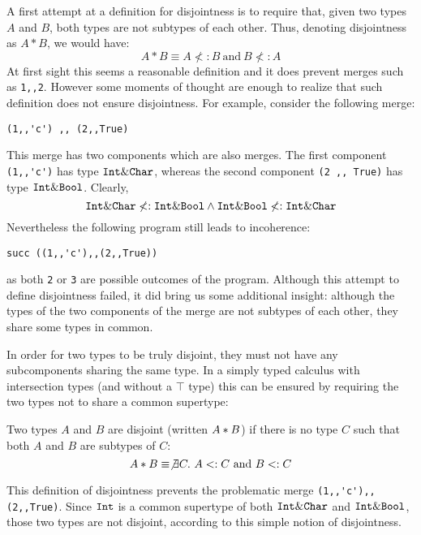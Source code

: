 A first attempt at a definition for disjointness is to require that,
given two types $A$ and $B$, both types are not subtypes of each
other. Thus, denoting disjointness as $A * B$, we would have:
\[A * B \equiv A \not<: B~\text{and}~B \not<: A\]
At first sight this seems a reasonable definition and it does prevent
merges such as \lstinline{1,,2}. However some moments of thought are enough to realize that
such definition does not ensure disjointness. For example, consider
the following merge:

\begin{lstlisting}
(1,,'c') ,, (2,,True)
\end{lstlisting}

\noindent This merge has two components which are also merges. 
The first component \lstinline{(1,,'c')} has type $\texttt{Int} \&
\texttt{Char}$, whereas the second component \lstinline{(2 ,, True)} has type
$\texttt{Int} \& \texttt{Bool}$. Clearly,
\[ \texttt{Int} \& \texttt{Char} \not <: \texttt{Int} \& \texttt{Bool} \wedge \texttt{Int} \& \texttt{Bool} \not <: \texttt{Int} \& \texttt{Char} \]
Nevertheless the following program still leads to
incoherence:
\begin{lstlisting}
succ ((1,,'c'),,(2,,True))
\end{lstlisting}
as both \lstinline{2} or \lstinline{3} are possible outcomes
of the program. Although this attempt to define disjointness failed,
it did bring us some additional insight: although the types of the two
components of the merge are not subtypes of each other, they share
some types in common.

In order for two types to be truly disjoint, they must not have any
subcomponents sharing the same type. In a simply typed calculus with intersection
types (and without a $\top$ type) this can be ensured by requiring the two types 
not to share a common supertype: 

\begin{definition}
  Two types $A$ and $B$ are disjoint
  (written $A * B$) if there is no type $C$ such that both $A$ and $B$ are
  subtypes of $C$:
  \[A * B \equiv \not\exists C.~A <: C~\text{and}~B<: C\]
\end{definition}\label{def:simple_dis}

\noindent This definition of disjointness prevents the problematic merge
\lstinline$(1,,'c'),,(2,,True)$. Since $\texttt{Int}$ is a
common supertype of both $\texttt{Int} \& \texttt{Char}$ and $\texttt{Int}
\& \texttt{Bool}$, those two types are not disjoint, according to this
simple notion of disjointness.

